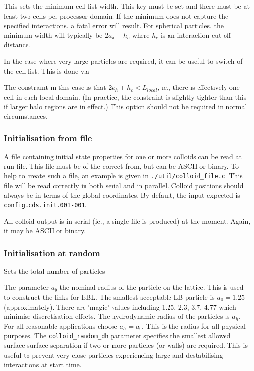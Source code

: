 
This sets the minimum cell list width. This key must be set and there
must be at least two cells per processor domain. If the minimum does
not capture the specified interactions, a fatal error will result.
For spherical particles, the minimum width will typically be
$2a_h + h_c$ where $h_c$ is an interaction cut-off distance.


In the case where very large particles are required, it can be useful
to switch of the cell list. This is done via


The constraint in this case is that $2a_h + h_c < L_{local}$, ie.,
there is effectively one cell in each local domain. (In practice,
the constraint is slightly tighter than this if larger halo regions
are in effect.) This option
should not be required in normal circumstances.


\subsubsection{Initialisation from file}

A file containing initial state properties for one or more colloids
can be read at run file. This file must be of the correct from, but
can be ASCII or binary. To help to create such a file, an example
is given in \texttt{./util/colloid\_file.c}. This file will be
read correctly in both serial and in parallel. Colloid positions
should always be in terms of the global coordinates. By default,
the input expected is \texttt{config.cds.init.001-001}.

All colloid output is in serial (ie., a single file is produced)
at the moment. Again, it may be ASCII or binary.

\subsubsection{Initialisation at random}

 Sets the total number of particles




The parameter $a_0$ the nominal radius of the particle on the lattice.
This is used to construct the links for BBL. The smallest acceptable LB
particle is $a_0 = 1.25$ (approximately). There are 'magic' values
including 1.25, 2.3, 3.7, 4.77 which minimise discretisation effects.
The hydrodynamic radius of the particles is $a_h$. For all
reasonable applications choose $a_h = a_0$. This is the radius for
all physical purposes. The \texttt{colloid\_random\_dh} parameter
specifies the smallest allowed surface-surface separation if two or
more particles (or walls) are required. This is useful to prevent
very close particles experiencing large and destabilising interactions
at start time.

